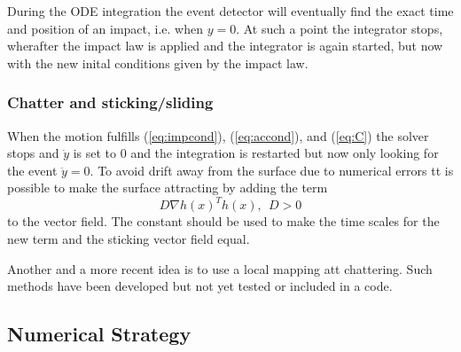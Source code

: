 \documentclass[10pt]{article}
\begin{document}
During the ODE integration the event detector will eventually find the exact time and position of an impact, i.e. when $y=0$. At such a point the integrator stops, wherafter the impact law is applied and the integrator is again started, but now with the new inital conditions given by the impact law.

\subsubsection*{Chatter and sticking/sliding}
When the motion fulfills (\ref{eq:impcond}), (\ref{eq:accond}), and (\ref{eq:C}) the solver stops and $\dot{y}$ is set to $0$ and the integration is restarted but now only looking for the event $\ddot{y} = 0$. To avoid drift away from the surface due to numerical errors tt is possible to make the surface attracting by adding the term
\begin{equation}
D\nabla h(x)^Th(x), \ \ D > 0
\end{equation}  
to the vector field. The constant should be used to make the time scales for the new term and the sticking vector field equal.

Another and a more recent idea is to use a local mapping att chattering. Such methods have been developed but not yet tested or included in a code.  

\subsection{Numerical Strategy}

\end{document}
